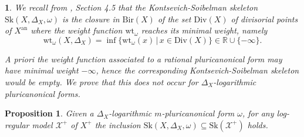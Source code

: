 \documentclass{amsart}%
\numberwithin{equation}{subsection}
\theoremstyle{plain2}
\newtheorem{prop}[equation]{Proposition}
\theoremstyle{definition2}
\theoremstyle{stepstyle}
\theoremstyle{point}
\theoremstyle{subpoint}
\newtheorem{subpoint}[equation]{}%
\newcommand{\spa}[1]{\begin{subpoint}#1\end{subpoint}}           %
\newcommand{\R}{\ensuremath{\mathbb{R}}}
\newcommand{\cX}{\ensuremath{\mathscr{X}}}
\renewcommand{\R}{\ensuremath{\mathbb{R}}}
\newcommand{\weight}{\mathrm{wt}}
\newcommand{\Sk}{\mathrm{Sk}}
\begin{document}
\spa{We recall from \cite{MustataNicaise}, Section 4.5 that the Kontsevich-Soibelman skeleton $\Sk(X, \Delta_X, \omega)$ is the closure in $\text{Bir}(X)$ of the set $\text{Div}(X) $ of divisorial points of $X^\text{an}$ where the weight function $\weight_\omega$ reaches its minimal weight, namely $$\weight_{\omega}(X, \Delta_X) = \inf \{ \weight_{\omega}(x) \,| \, x \in \text{Div}(X) \} \in \R \cup \{ -\infty\}.$$

A priori the weight function associated to a rational pluricanonical form may have minimal weight $-\infty$, hence the corresponding Kontsevich-Soibelman skeleton would be empty. We prove that this does not occur for $\Delta_X$-logarithmic pluricanonical forms.
}

\begin{prop} \label{prop KS inside log-reg model}
Given a $\Delta_X$-logarithmic $m$-pluricanonical form $\omega$, for any log-regular model $\cX^+$ of $X^+$ the inclusion $\Sk(X,\Delta_X,\omega) \subseteq \Sk(\cX^+)$ holds.
\end{prop}
\end{document}
